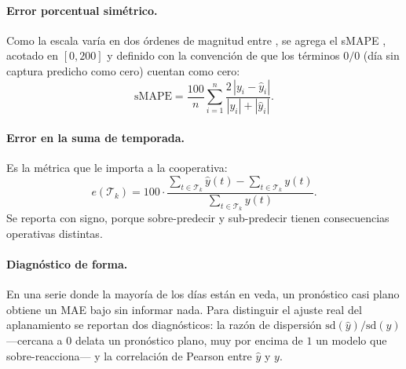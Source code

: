 \paragraph{Error porcentual simétrico.} Como la escala varía en dos órdenes de magnitud entre
\UEs{}, se agrega el sMAPE \citep{hyndman2006}, acotado en $[0, 200]$ y definido con la convención de que los
términos $0/0$ (día sin captura predicho como cero) cuentan como cero:
\begin{equation}
  \mathrm{sMAPE} = \frac{100}{n} \sum_{i=1}^{n}
  \frac{2\,|y_i - \hat{y}_i|}{|y_i| + |\hat{y}_i|}.
\end{equation}

\paragraph{Error en la suma de temporada.} Es la métrica que le importa a la cooperativa:
\begin{equation}
  e(\mathcal{T}_k) = 100 \cdot
  \frac{\sum_{t \in \mathcal{T}_k}\hat{y}(t) - \sum_{t \in \mathcal{T}_k} y(t)}
       {\sum_{t \in \mathcal{T}_k} y(t)} .
\end{equation}
Se reporta con signo, porque sobre-predecir y sub-predecir tienen consecuencias operativas
distintas.

\paragraph{Diagnóstico de forma.} En una serie donde la mayoría de los días están en veda, un
pronóstico casi plano obtiene un MAE bajo sin informar nada. Para distinguir el ajuste real del
aplanamiento se reportan dos diagnósticos: la razón de dispersión
$\mathrm{sd}(\hat{y})/\mathrm{sd}(y)$ ---cercana a $0$ delata un pronóstico plano, muy por
encima de $1$ un modelo que sobre-reacciona--- y la correlación de Pearson entre $\hat{y}$ y
$y$.

